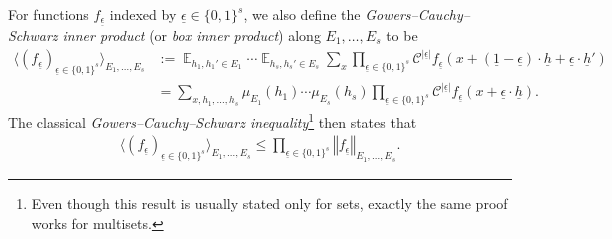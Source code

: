 \documentclass[11pt]{amsart}
\theoremstyle{definition}
\DeclareMathOperator*{\E}{\mathbb{E}}
\newcommand{\CC}{{\mathcal C}}
\newcommand{\uh}{{\underline{h}}}
\newcommand{\ueps}{{\underline{\epsilon}}}
\newcommand{\norm}[1]{\left\Vert #1\right\Vert}
\begin{document}
For functions $f_\ueps$ indexed by $\ueps\in\{0,1\}^s$, we also define the \textit{Gowers--Cauchy--Schwarz inner product} (or \textit{box inner product}) along $E_1, \ldots, E_s$ to be
\begin{align*}
    \langle (f_\ueps)_{\ueps\in\{0,1\}^s} \rangle_{E_1, \ldots, E_s} &:=\E_{h_1, h_1'\in E_1}\cdots\E_{h_s, h_s'\in E_s}\sum_x \prod_{\ueps\in\{0,1\}^s}\CC^{|\ueps|}f_\ueps(x+(\underline{1}-\ueps)\cdot\uh + \ueps\cdot\uh')\\
    &= \sum_{x, h_1, \ldots, h_s} \mu_{E_1}(h_1)\cdots \mu_{E_s}(h_s) \prod_{\ueps\in\{0,1\}^s}\CC^{|\ueps|}f_\ueps(x+\ueps\cdot\uh).
\end{align*} 
The classical \textit{Gowers--Cauchy--Schwarz inequality}\footnote{Even though this result is usually stated only for sets, exactly the same proof works for multisets.} then states that
\begin{align}
    \langle (f_\ueps)_{\ueps\in\{0,1\}^s} \rangle_{E_1, \ldots, E_s} \leq \prod_{\ueps\in\{0,1\}^s}\norm{f_\ueps}_{E_1, \ldots, E_s}.
\end{align}
\end{document}
